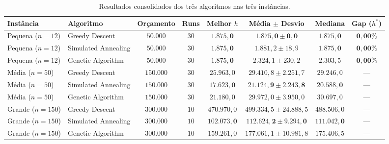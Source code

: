 \documentclass[11pt,a4paper]{article}
\begin{document}
\begin{table}[htbp]
\centering
\small
\caption{Resultados consolidados dos três algoritmos nas três instâncias.}
\label{tab:principal}
\begin{tabular}{llcccccc}
\toprule
\textbf{Instância} & \textbf{Algoritmo} & \textbf{Orçamento} & \textbf{Runs} & \textbf{Melhor $h$} & \textbf{Média $\pm$ Desvio} & \textbf{Mediana} & \textbf{Gap ($h^*$)} \\
\midrule
Pequena ($n=12$) & Greedy Descent      & $50.000$  & $30$ & $\mathbf{1.875,0}$ & $\mathbf{1.875,0 \pm 0,0}$ & $\mathbf{1.875,0}$ & $\mathbf{0,00\%}$ \\
Pequena ($n=12$) & Simulated Annealing & $50.000$  & $30$ & $\mathbf{1.875,0}$ & $1.881,2 \pm 18,9$         & $\mathbf{1.875,0}$ & $\mathbf{0,00\%}$ \\
Pequena ($n=12$) & Genetic Algorithm   & $50.000$  & $30$ & $\mathbf{1.875,0}$ & $2.324,1 \pm 230,2$        & $2.303,5$          & $\mathbf{0,00\%}$ \\
\midrule
Média ($n=50$)   & Greedy Descent      & $150.000$ & $30$ & $25.963,0$         & $29.410,8 \pm 2.251,7$     & $29.246,0$          & --- \\
Média ($n=50$)   & Simulated Annealing & $150.000$ & $30$ & $\mathbf{17.623,0}$ & $\mathbf{21.124,9 \pm 2.243,8}$ & $\mathbf{20.588,0}$ & --- \\
Média ($n=50$)   & Genetic Algorithm   & $150.000$ & $30$ & $21.180,0$         & $29.972,0 \pm 3.950,0$     & $30.697,0$          & --- \\
\midrule
Grande ($n=150$) & Greedy Descent      & $300.000$ & $10$ & $470.970,0$        & $499.334,5 \pm 24.888,5$   & $488.506,0$         & --- \\
Grande ($n=150$) & Simulated Annealing & $300.000$ & $10$ & $\mathbf{102.073,0}$ & $\mathbf{112.624,2 \pm 9.294,0}$ & $\mathbf{111.042,0}$ & --- \\
Grande ($n=150$) & Genetic Algorithm   & $300.000$ & $10$ & $159.261,0$        & $177.061,1 \pm 10.981,8$   & $175.406,5$         & --- \\
\bottomrule
\end{tabular}
\end{table}
\end{document}
